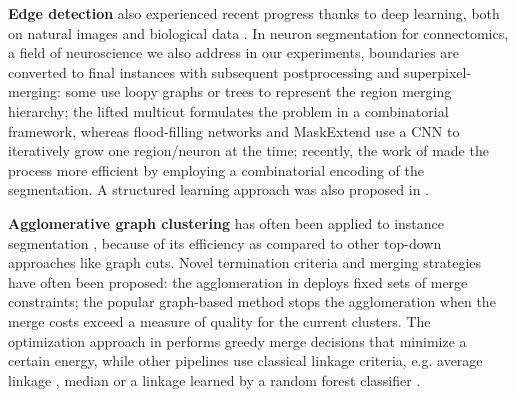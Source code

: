 \textbf{Edge detection} also experienced recent progress thanks to deep learning, both on natural images \cite{Gao_2019_ICCV,liu2018affinity,xie2015holistically,kokkinos2015pushing} and biological data \cite{lee2017superhuman,schmidt2018cell,meirovitch2016multi,ciresan2012deep}. In neuron segmentation for connectomics, a field of neuroscience we also address in our experiments, boundaries are converted to final instances with subsequent postprocessing and superpixel-merging:
some use loopy graphs \cite{kaynig2015large,krasowski2015improving} or trees \cite{meirovitch2016multi,liu2016sshmt,liu2014modular,funke2015learning,uzunbas2016efficient} to represent the region merging hierarchy; the lifted multicut \cite{beier2017multicut} formulates the problem in a combinatorial framework, whereas 
flood-filling networks \cite{januszewski2018high} and MaskExtend \cite{meirovitch2016multi} use a CNN to iteratively grow one region/neuron at the time; recently, the work of \cite{meirovitch2019cross} made the process more efficient by employing a combinatorial encoding of the segmentation.
A structured learning approach was also proposed in \cite{funke2018large,turaga2009maximin}.

\textbf{Agglomerative graph clustering} has often been applied to instance segmentation \cite{arbelaez2011contour,ren2013image,liu2016image,salembier2000binary}, because of its efficiency as compared to other top-down approaches like graph cuts. 
Novel termination criteria and merging strategies have often been proposed: the agglomeration in \cite{malmberg2011generalized} deploys fixed sets of merge constraints; 
the popular graph-based method \cite{felzenszwalb2004efficient} stops the agglomeration when the merge costs exceed a measure of quality for the current clusters. 
The optimization approach in \cite{kiran2014global} performs greedy merge decisions that minimize a certain energy, while other pipelines use classical linkage criteria, e.g. average linkage \cite{liu2018affinity,lee2017superhuman}, median \cite{funke2018large} or a linkage learned by a random forest classifier \cite{nunez2013machine,knowles2016rhoananet}.

